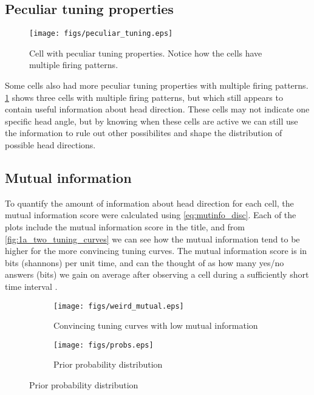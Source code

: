 \subsection{Peculiar tuning properties}
\begin{figure}[H]
    \centering
    \texttt{[image: figs/peculiar\_tuning.eps]}
    \caption{Cell with peculiar tuning properties. Notice how the cells have multiple firing patterns.}
    \label{fig:peculiar_tuning}
\end{figure}
Some cells also had more peculiar tuning properties with multiple firing patterns. \cref{fig:peculiar_tuning} shows three cells with multiple firing patterns, but which still appears to contain useful information about head direction. These cells may not indicate one specific head angle, but by knowing when these cells are active we can still use the information to rule out other possibilites and shape the distribution of possible head directions.

\subsection{Mutual information}
To quantify the amount of information about head direction for each cell, the mutual information score were calculated using \cref{eq:mutinfo_disc}. Each of the plots include the mutual information score in the title, and from \cref{fig:1a_two_tuning_curves} we can see how the mutual information tend to be higher for the more convincing tuning curves. The mutual information score is in bits (shannons) per unit time, and can the thought of as how many yes/no answers (bits) we gain on average after observing a cell during a sufficiently short time interval \cite{mutualinfo}.

\begin{figure}[H]
    \centering
    \begin{subfigure}[b]{0.49\textwidth}
        \texttt{[image: figs/weird\_mutual.eps]}
        \caption{Convincing tuning curves with low mutual information}
        \label{fig:weird_mutual}
    \end{subfigure}
    \begin{subfigure}[b]{0.49\textwidth}
        \texttt{[image: figs/probs.eps]}
        \caption{Prior probability distribution}
        \label{fig:probs}
    \end{subfigure}
\end{figure}

